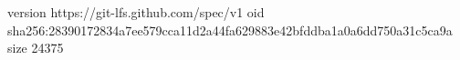 version https://git-lfs.github.com/spec/v1
oid sha256:28390172834a7ee579cca11d2a44fa629883e42bfddba1a0a6dd750a31c5ca9a
size 24375
